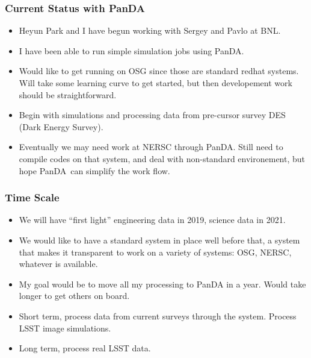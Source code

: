 \documentclass{beamer}
\newcommand{\panda}{PanDA}
\begin{document}
\frame
{
    \frametitle{Current Status with \panda}

 
    \begin{itemize}

        \item Heyun Park and I have begun working with Sergey and Pavlo at BNL.

        \item I have been able to run simple simulation jobs using \panda.

        \item Would like to get running on OSG since those are standard redhat
            systems.  Will take some learning curve to get started, but then
            developement work should be straightforward.

        \item Begin with simulations and processing data from pre-cursor survey
            DES (Dark Energy Survey).

        \item Eventually we may need work at NERSC through \panda.  Still need
            to compile codes on that system, and deal with non-standard
            environement, but hope \panda\ can simplify the work flow.

    \end{itemize}

}

\frame
{
    \frametitle{Time Scale}

 
    \begin{itemize}

        \item We will have ``first light'' engineering data in 2019, science
            data in 2021.

        \item We would like to have a standard system in place well before that, a system
            that makes it transparent to work on a variety of systems: OSG, NERSC, whatever
            is available.

        \item My goal would be to move all my processing to PanDA in a year.
            Would take longer to get others on board.

        \item Short term, process data from current surveys through the
            system.  Process LSST image simulations.

        \item Long term, process real LSST data.

    \end{itemize}

}
\end{document}
